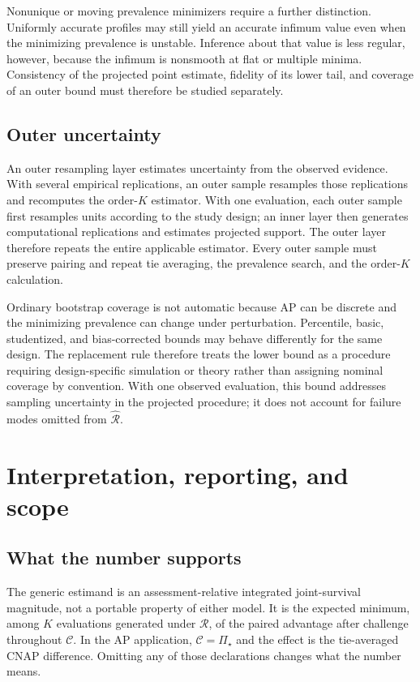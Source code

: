 \documentclass[11pt]{article}
\newcommand{\Regime}{\mathcal{R}}
\newcommand{\CSet}{\mathcal{C}}
\newcommand{\PSet}{\Pi_\star}
\theoremstyle{remark}
\begin{document}
Nonunique or moving prevalence minimizers require a further distinction. Uniformly accurate profiles may still yield an accurate infimum value even when the minimizing prevalence is unstable. Inference about that value is less regular, however, because the infimum is nonsmooth at flat or multiple minima. Consistency of the projected point estimate, fidelity of its lower tail, and coverage of an outer bound must therefore be studied separately.

\subsection{Outer uncertainty}

An outer resampling layer estimates uncertainty from the observed evidence. With several empirical replications, an outer sample resamples those replications and recomputes the order-$K$ estimator. With one evaluation, each outer sample first resamples units according to the study design; an inner layer then generates computational replications and estimates projected support. The outer layer therefore repeats the entire applicable estimator. Every outer sample must preserve pairing and repeat tie averaging, the prevalence search, and the order-$K$ calculation.

Ordinary bootstrap coverage is not automatic because AP can be discrete and the minimizing prevalence can change under perturbation. Percentile, basic, studentized, and bias-corrected bounds may behave differently for the same design. The replacement rule therefore treats the lower bound as a procedure requiring design-specific simulation or theory rather than assigning nominal coverage by convention. With one observed evaluation, this bound addresses sampling uncertainty in the projected procedure; it does not account for failure modes omitted from $\widehat{\Regime}$.

\section{Interpretation, reporting, and scope}
\label{sec:discussion}

\subsection{What the number supports}

The generic estimand is an assessment-relative integrated joint-survival magnitude, not a portable property of either model. It is the expected minimum, among $K$ evaluations generated under $\Regime$, of the paired advantage after challenge throughout $\CSet$. In the AP application, $\CSet=\PSet$ and the effect is the tie-averaged CNAP difference. Omitting any of those declarations changes what the number means.
\end{document}

